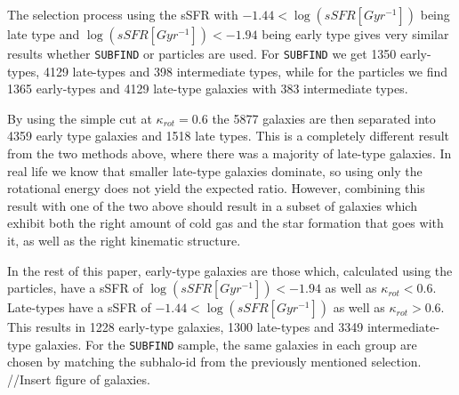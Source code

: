 The selection process using the sSFR with $ -1.44 < \log (sSFR[Gyr^{-1}]) $ being late type and $\log (sSFR[Gyr^{-1}]) < -1.94$ being early type gives very similar results whether \texttt{SUBFIND} or particles are used. For \texttt{SUBFIND} we get 1350 early-types, 4129 late-types and 398 intermediate types, while for the particles we find 1365 early-types and 4129 late-type galaxies with 383 intermediate types.

By using the simple cut at $\kappa_{rot} = 0.6$ the 5877 galaxies are then separated into 4359 early type galaxies and 1518 late types. This is a completely different result from the two methods above, where there was a majority of late-type galaxies. In real life we know that smaller late-type galaxies dominate, so using only the rotational energy does not yield the expected ratio. However, combining this result with one of the two above should result in a subset of galaxies which exhibit both the right amount of cold gas and the star formation that goes with it, as well as the right kinematic structure.

In the rest of this paper, early-type galaxies are those which, calculated using the particles, have a sSFR of $\log (sSFR[Gyr^{-1}]) < -1.94$ as well as $\kappa_{rot} < 0.6$. Late-types have a sSFR of $ -1.44 < \log (sSFR[Gyr^{-1}]) $ as well as $\kappa_{rot} > 0.6$. This results in 1228 early-type galaxies, 1300 late-types and 3349 intermediate-type galaxies. For the \texttt{SUBFIND} sample, the same galaxies in each group are chosen by matching the subhalo-id from the previously mentioned selection. //Insert figure of galaxies.